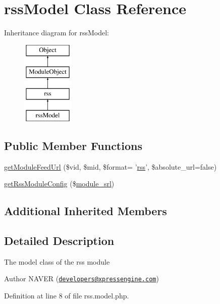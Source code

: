 \hypertarget{classrssModel}{\section{rss\-Model Class Reference}
\label{classrssModel}
}
Inheritance diagram for rss\-Model\-:\begin{figure}[H]
\begin{center}
\leavevmode
\includegraphics[height=4.000000cm]{classrssModel}
\end{center}
\end{figure}
\subsection*{Public Member Functions}
\begin{DoxyCompactItemize}
\item 
\hyperlink{classrssModel_a2e188c3e11aab64655f3eb3d40b41ec3}{get\-Module\-Feed\-Url} (\$vid, \$mid, \$format= '\hyperlink{classrss}{rss}', \$absolute\-\_\-url=false)
\item 
\hyperlink{classrssModel_a3c6f9fd398a931ff32038e2a48745bad}{get\-Rss\-Module\-Config} (\$\hyperlink{ko_8install_8php_a370bb6450fab1da3e0ed9f484a38b761}{module\-\_\-srl})
\end{DoxyCompactItemize}
\subsection*{Additional Inherited Members}


\subsection{Detailed Description}
The model class of the rss module

\begin{DoxyAuthor}{Author}
N\-A\-V\-E\-R (\href{mailto:developers@xpressengine.com}{\tt developers@xpressengine.\-com}) 
\end{DoxyAuthor}


Definition at line 8 of file rss.\-model.\-php.



